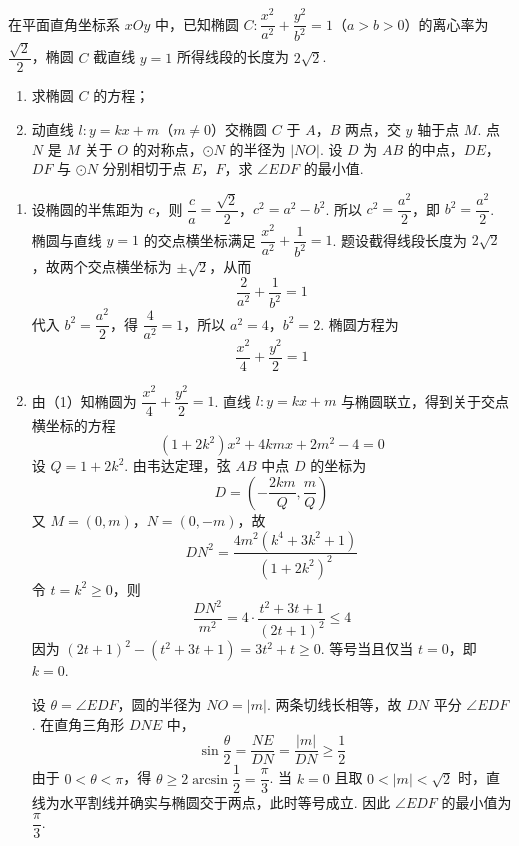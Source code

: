 \begin{problem}
在平面直角坐标系 \(xOy\) 中，已知椭圆 \(C:\dfrac{x^2}{a^2}+\dfrac{y^2}{b^2}=1\)（\(a>b>0\)）的离心率为 \(\dfrac{\sqrt2}{2}\)，椭圆 \(C\) 截直线 \(y=1\) 所得线段的长度为 \(2\sqrt2\).

\begin{enumerate}
\item 求椭圆 \(C\) 的方程；
\item 动直线 \(l:y=kx+m\)（\(m\ne0\)）交椭圆 \(C\) 于 \(A\)，\(B\) 两点，交 \(y\) 轴于点 \(M\). 点 \(N\) 是 \(M\) 关于 \(O\) 的对称点，\(\odot N\) 的半径为 \(\lvert NO\rvert\). 设 \(D\) 为 \(AB\) 的中点，\(DE\)，\(DF\) 与 \(\odot N\) 分别相切于点 \(E\)，\(F\)，求 \(\angle EDF\) 的最小值.
\end{enumerate}

\end{problem}

\begin{solution}
\begin{enumerate}
\item 设椭圆的半焦距为 \(c\)，则
\(\dfrac ca=\dfrac{\sqrt2}{2}\)，\(c^2=a^2-b^2\).
所以 \(c^2=\dfrac{a^2}{2}\)，即 \(b^2=\dfrac{a^2}{2}\). 椭圆与直线 \(y=1\) 的交点横坐标满足
\(\dfrac{x^2}{a^2}+\dfrac1{b^2}=1\). 题设截得线段长度为 \(2\sqrt2\)，故两个交点横坐标为 \(\pm\sqrt2\)，从而
\[
\dfrac2{a^2}+\dfrac1{b^2}=1
\]
代入 \(b^2=\dfrac{a^2}{2}\)，得 \(\dfrac4{a^2}=1\)，所以 \(a^2=4\)，\(b^2=2\). 椭圆方程为
\[
\dfrac{x^2}{4}+\dfrac{y^2}{2}=1
\]

\item 由（1）知椭圆为 \(\dfrac{x^2}{4}+\dfrac{y^2}{2}=1\). 直线 \(l:y=kx+m\) 与椭圆联立，得到关于交点横坐标的方程
\[
\left(1+2k^2\right)x^2+4kmx+2m^2-4=0
\]
设 \(Q=1+2k^2\). 由韦达定理，弦 \(AB\) 中点 \(D\) 的坐标为
\[
D=\left(-\dfrac{2km}{Q},\dfrac{m}{Q}\right)
\]
又 \(M=(0,m)\)，\(N=(0,-m)\)，故
\[
DN^2=\dfrac{4m^2\left(k^4+3k^2+1\right)}{\left(1+2k^2\right)^2}
\]
令 \(t=k^2\geq0\)，则
\[
\dfrac{DN^2}{m^2}=4\cdot\dfrac{t^2+3t+1}{(2t+1)^2}\leq4
\]
因为 \((2t+1)^2-(t^2+3t+1)=3t^2+t\geq0\). 等号当且仅当 \(t=0\)，即 \(k=0\).

设 \(\theta=\angle EDF\)，圆的半径为 \(NO=|m|\). 两条切线长相等，故 \(DN\) 平分 \(\angle EDF\). 在直角三角形 \(DNE\) 中，
\[
\sin\dfrac\theta2=\dfrac{NE}{DN}=\dfrac{|m|}{DN}\geq\dfrac12
\]
由于 \(0<\theta<\pi\)，得 \(\theta\geq2\arcsin\dfrac12=\dfrac\pi3\). 当 \(k=0\) 且取 \(0<|m|<\sqrt2\) 时，直线为水平割线并确实与椭圆交于两点，此时等号成立. 因此 \(\angle EDF\) 的最小值为 \(\dfrac\pi3\).
\end{enumerate}
\end{solution}
